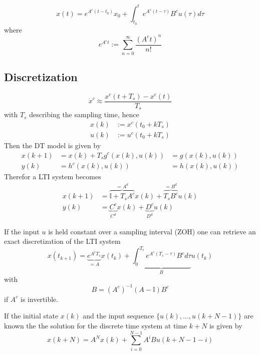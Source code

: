 
\begin{equation*}
    x(t) = e^{A^c(t-t_0)}x_0 + \int_{t_0}^{t}e^{A^c(t-\tau)}B^c u(\tau)d\tau
\end{equation*}
where
\begin{equation*}
    e^{A^c t} := \sum_{n=0}^{\infty}\frac{{(A^c t)}^n}{n!}
\end{equation*}

\subsection{Discretization}

\begin{equation*}
    \dot{x}^c \approx \frac{x^c(t + T_s)-x^c(t)}{T_s}
\end{equation*}
with $T_s$ describing the sampling time, hence
\begin{align*}
    x(k) & := x^c(t_0 + kT_s) \\
    u(k) & := u^c(t_0 + kT_s)
\end{align*}
Then the DT model is given by
\begin{align*}
    x(k+1) & = x(k) + T_s g^c (x(k),u(k)) & = g(x(k),u(k)) \\
    y(k)   & = h^c(x(k),u(k))             & = h(x(k),u(k))
\end{align*}
Therefor a LTI system becomes
\begin{align*}
    x(k+1) & = \overbrace{\mathbb{I} + T_s A^c}^{=A^d} x(k) + \overbrace{T_s B^c}^{=B^d} u(k) \\
    y(k)   & = \underbrace{C^c}_{C^d} x(k) + \underbrace{D^c}_{D^d} u(k)
\end{align*}

\newpar{}

If the input $u$ is held constant over a sampling interval (ZOH) one can retrieve an exact discretization of the LTI system
\begin{equation*}
    x(t_{k+1}) = \underbrace{e^{A^c T_s}}_{=A} x(t_k) + \underbrace{\int_{0}^{T_s} e^{A^c(T_s - \tau)}B^c d\tau}_{B} u(t_k)
\end{equation*}
with
\begin{equation*}
    B={(A^c)}^{-1}(A-\mathbb{I})B^c
\end{equation*}
if $A^c$ is invertible.

\newpar{}
If the initial state $x(k)$ and the input sequence $\{u(k), \ldots, u(k+N-1)\}$ are known the the solution for the discrete time system at time $k+N$ is given by
\begin{equation*}
    x(k+N) = A^N x(k) + \sum_{i=0}^{N-1} A^i B u(k+N-1-i)
\end{equation*}


